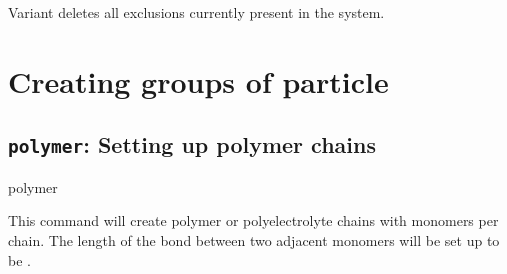 Variant  deletes all exclusions currently present in the
system.

\section{Creating groups of particle}

\subsection{\texttt{polymer}: Setting up polymer chains}

\begin{essyntax}
  polymer 
   
  \\
  \begin{features}
  \end{features}
\end{essyntax}

This command will create  polymer or
polyelectrolyte chains with  monomers per
chain. The length of the bond between two adjacent monomers will be
set up to be .

